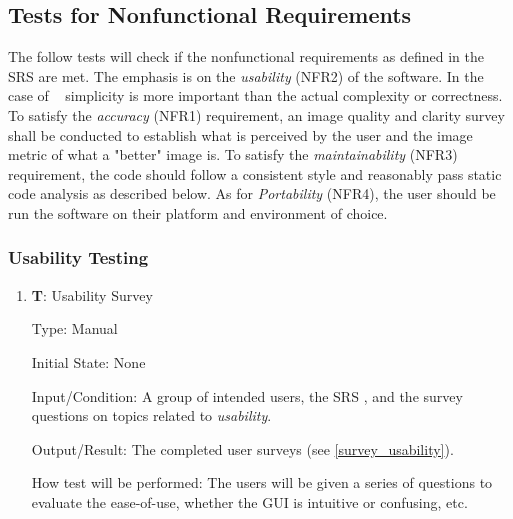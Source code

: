 \documentclass[12pt, titlepage]{article}
\newcounter{testnum} %
\begin{document}
\subsection{Tests for Nonfunctional Requirements}

The follow tests will check if the nonfunctional requirements as defined in the SRS \citep{SRS} are 
met. The emphasis is on the \textit{usability} (NFR2) of the software. In the case of \progname~
simplicity is more important than the actual complexity or correctness.
To satisfy the \textit{accuracy} (NFR1) requirement, an image quality and clarity survey shall be
conducted to establish what is perceived by the user and the image metric of what 
a "better" image is. To satisfy the \textit{maintainability} (NFR3) requirement, the code should 
follow a consistent style and reasonably pass static code analysis as described below.
As for \textit{Portability} (NFR4), the user should be run the software on their platform and 
environment of choice.

\subsubsection{Usability Testing}
\begin{enumerate}

  \item{\textbf{T\thetestnum \label{T_surveyUsability}}: Usability Survey\\}

  Type: Manual
            
  Initial State: None
            
  Input/Condition: A group of intended users, the SRS \citep{SRS}, and 
  the survey questions on topics related to \textit{usability}.
            
  Output/Result: The completed user surveys (see \ref{survey_usability}).
            
  How test will be performed: The users will be given a series of questions to evaluate the 
  ease-of-use, whether the GUI is intuitive or confusing, etc.

\end{enumerate}
\end{document}
